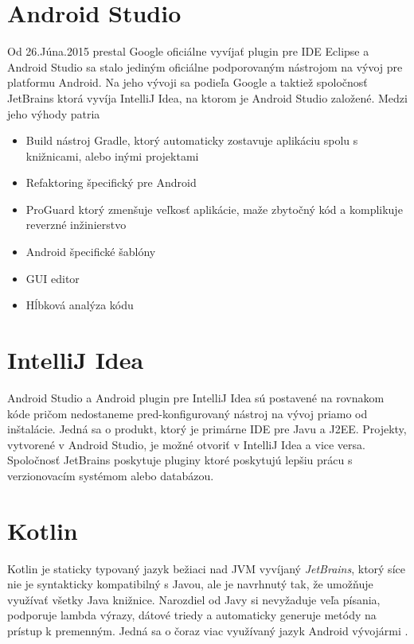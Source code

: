 \section{Android Studio}

Od 26.Júna.2015 prestal Google oficiálne vyvíjať plugin pre IDE Eclipse \cite{androidstudio} a Android Studio sa stalo jediným oficiálne podporovaným nástrojom na vývoj pre platformu Android. Na jeho vývoji sa podieľa Google a taktiež spoločnosť JetBrains ktorá vyvíja IntelliJ Idea, na ktorom je Android Studio založené. Medzi jeho výhody patria \cite{androidstudio2} 


\begin{itemize}

\item Build nástroj Gradle, ktorý automaticky zostavuje aplikáciu spolu s knižnicami, alebo inými projektami
\item Refaktoring špecifický pre Android
\item ProGuard ktorý zmenšuje veľkosť aplikácie, maže zbytočný kód a komplikuje reverzné inžinierstvo
\item Android špecifické šablóny
\item GUI editor 
\item Hĺbková analýza kódu

\end{itemize}

\section{IntelliJ Idea}

Android Studio a Android plugin pre IntelliJ Idea sú postavené na rovnakom kóde \cite{androidstudio3} pričom nedostaneme pred-konfigurovaný nástroj na vývoj priamo od inštalácie. Jedná sa o produkt, ktorý je primárne IDE pre Javu a J2EE. Projekty, vytvorené v Android Studio, je možné otvoriť v IntelliJ Idea a vice versa. Spoločnosť JetBrains poskytuje pluginy ktoré poskytujú lepšiu prácu s verzionovacím systémom alebo databázou.


\section{Kotlin}

Kotlin je staticky typovaný jazyk bežiaci nad JVM vyvíjaný \textit{JetBrains}, ktorý síce nie je syntakticky kompatibilný s Javou, ale je navrhnutý tak, že umožňuje využívať všetky Java knižnice. Narozdiel od  Javy si nevyžaduje veľa písania, podporuje lambda výrazy, dátové triedy a automaticky generuje metódy na prístup k premenným. Jedná sa o čoraz viac využívaný jazyk Android  vývojármi \cite{kotlin}. 

